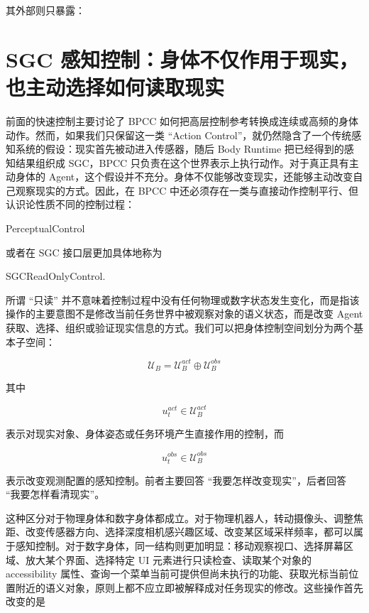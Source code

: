 其外部则只暴露：
\begin{statementbox}
\centering
{}
\end{statementbox}



\section{SGC 感知控制：身体不仅作用于现实，也主动选择如何读取现实}

前面的快速控制主要讨论了 BPCC 如何把高层控制参考转换成连续或高频的身体动作。然而，如果我们只保留这一类 ``Action Control''，就仍然隐含了一个传统感知系统的假设：现实首先被动进入传感器，随后 Body Runtime 把已经得到的感知结果组织成 SGC，BPCC 只负责在这个世界表示上执行动作。对于真正具有主动身体的 Agent，这个假设并不充分。身体不仅能够改变现实，还能够主动改变自己观察现实的方式。因此，在 BPCC 中还必须存在一类与直接动作控制平行、但认识论性质不同的控制过程：

\begin{statementbox}
PerceptualControl
\end{statementbox}

或者在 SGC 接口层更加具体地称为

\begin{statementbox}
SGCReadOnlyControl.
\end{statementbox}

所谓 ``只读'' 并不意味着控制过程中没有任何物理或数字状态发生变化，而是指该操作的主要意图不是修改当前任务世界中被观察对象的语义状态，而是改变 Agent 获取、选择、组织或验证现实信息的方式。我们可以把身体控制空间划分为两个基本子空间：

\[
\boxed{
\mathcal U_B
=
\mathcal U_B^{act}
\oplus
\mathcal U_B^{obs}
}
\]

其中

\[
u_t^{act}
\in
\mathcal U_B^{act}
\]

表示对现实对象、身体姿态或任务环境产生直接作用的控制，而

\[
u_t^{obs}
\in
\mathcal U_B^{obs}
\]

表示改变观测配置的感知控制。前者主要回答 ``我要怎样改变现实''，后者回答 ``我要怎样看清现实''。

这种区分对于物理身体和数字身体都成立。对于物理机器人，转动摄像头、调整焦距、改变传感器方向、选择深度相机感兴趣区域、改变某区域采样频率，都可以属于感知控制。对于数字身体，同一结构则更加明显：移动观察视口、选择屏幕区域、放大某个界面、选择特定 UI 元素进行只读检查、读取某个对象的 accessibility 属性、查询一个菜单当前可提供但尚未执行的功能、获取光标当前位置附近的语义对象，原则上都不应立即被解释成对任务现实的修改。这些操作首先改变的是


